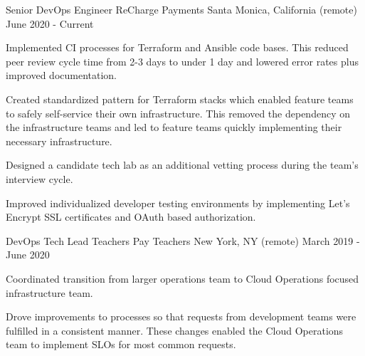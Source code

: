 

\begin{cventries}

  \cventry
  {Senior DevOps Engineer} %
  {ReCharge Payments} %
  {Santa Monica, California (remote)} %
  {June 2020 - Current} %
  { 
    \begin{cvitems} %
      \item {Implemented CI processes for Terraform and Ansible code bases. This reduced peer review cycle time from 2-3 days to under 1 day and lowered error rates plus improved documentation.}
      \item {Created standardized pattern for Terraform stacks which enabled feature teams to safely self-service their own infrastructure. This removed the dependency on the infrastructure teams and led to feature teams quickly implementing their necessary infrastructure.}
      \item {Designed a candidate tech lab as an additional vetting process during the team's interview cycle.}
      \item {Improved individualized developer testing environments by implementing Let's Encrypt SSL certificates and OAuth based authorization.}
    \end{cvitems}
  }

  \cventry
    {DevOps Tech Lead} %
    {Teachers Pay Teachers} %
    {New York, NY (remote)} %
    {March 2019 - June 2020} %
    {
      \begin{cvitems} %
        \item {Coordinated transition from larger operations team to Cloud Operations focused infrastructure team.}
        \item {Drove improvements to processes so that requests from development teams were fulfilled in a consistent manner. These changes enabled the Cloud Operations team to implement SLOs for most common requests.}
      \end{cvitems}
    }


\end{cventries}

